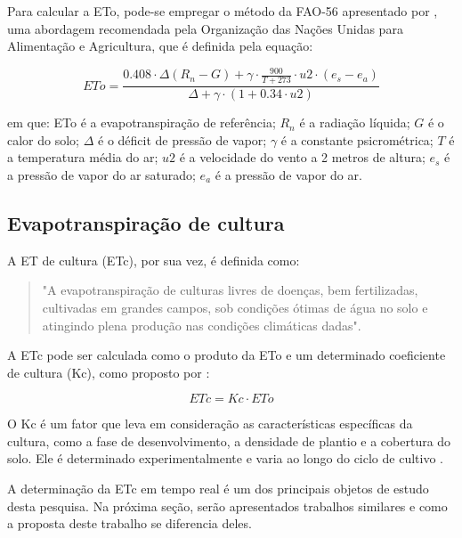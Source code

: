 Para calcular a ETo, pode-se empregar o método da FAO-56 apresentado por \textcite{Allen_evapotranspiration1998}, uma abordagem recomendada pela Organização das Nações Unidas para Alimentação e Agricultura, que é definida pela equação:

\begin{equation}
ETo = \frac{0.408 \cdot \Delta (R_n - G) + \gamma \cdot \frac{900}{T + 273} \cdot u2 \cdot (e_s - e_a)}{\Delta + \gamma \cdot (1 + 0.34 \cdot u2)}
\end{equation}

\noindent em que: ETo é a evapotranspiração de referência; $R_n$ é a radiação líquida; $G$ é o calor do solo; $\Delta$ é o déficit de pressão de vapor; $\gamma$ é a constante psicrométrica; $T$ é a temperatura média do ar; $u2$ é a velocidade do vento a 2 metros de altura; $e_s$ é a pressão de vapor do ar saturado; $e_a$ é a pressão de vapor do ar.

\subsection{Evapotranspiração de cultura}

A ET de cultura (ETc), por sua vez, é definida como:

\begin{quote}
  "A evapotranspiração de culturas livres de doenças, bem fertilizadas, cultivadas em grandes campos, sob condições ótimas de água no solo e atingindo plena produção nas condições climáticas dadas". \parencite[{p. 7}]{Allen_evapotranspiration1998}
\end{quote}

A ETc pode ser calculada como o produto da ETo e um determinado coeficiente de cultura (Kc), como proposto por \textcite{Allen_evapotranspiration1998}:

\begin{equation}
ETc = Kc \cdot ETo
\end{equation}

O Kc é um fator que leva em consideração as características específicas da cultura, como a fase de desenvolvimento, a densidade de plantio e a cobertura do solo. Ele é determinado experimentalmente e varia ao longo do ciclo de cultivo \parencite{bernardo_irrigacao2008}.

A determinação da ETc em tempo real é um dos principais objetos de estudo desta pesquisa. Na próxima seção, serão apresentados trabalhos similares e como a proposta deste trabalho se diferencia deles.

